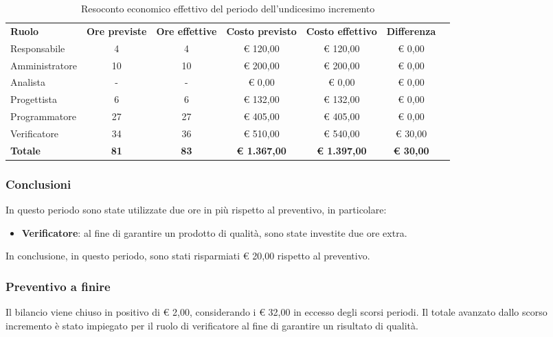 \documentclass[../piano-di-progetto.tex]{subfiles}
\begin{document}
  \begin{table}[H]
    \centering
    \begin{tabular}{lcccccc}
      \rowcolor{lightgray}
      \textbf{Ruolo}  & \textbf{Ore previste} & \textbf{Ore effettive} & \textbf{Costo previsto} & \textbf{Costo effettivo} & \textbf{Differenza} \\

Responsabile    & 4           & 4           & € 120,00            & € 120,00            & € 0,00           \\
Amministratore  & 10          & 10          & € 200,00            & € 200,00            & € 0,00           \\
Analista        & -           & -           & € 0,00              & € 0,00              & € 0,00           \\
Progettista     & 6           & 6           & € 132,00            & € 132,00            & € 0,00           \\
Programmatore   & 27          & 27          & € 405,00            & € 405,00            & € 0,00           \\
Verificatore    & 34          & 36          & € 510,00            & € 540,00            & € 30,00          \\
\textbf{Totale} & \textbf{81} & \textbf{83} & \textbf{€ 1.367,00} & \textbf{€ 1.397,00} & \textbf{€ 30,00}


    \end{tabular}
    \caption{Resoconto economico effettivo del periodo dell'undicesimo incremento}
  \end{table}

\subsubsection{Conclusioni}
In questo periodo sono state utilizzate due ore in più rispetto al preventivo, in particolare:
\begin{itemize}
    \item \textbf{Verificatore}: al fine di garantire un prodotto di qualità, sono state investite due ore extra.
\end{itemize}
In conclusione, in questo periodo, sono stati risparmiati € 20,00 rispetto al preventivo.

\subsubsection{Preventivo a finire}
Il bilancio viene chiuso in positivo di € 2,00, considerando i € 32,00 in eccesso degli scorsi periodi. Il totale avanzato dallo scorso incremento è stato impiegato per il ruolo di verificatore al fine di garantire un risultato di qualità.
\end{document}
